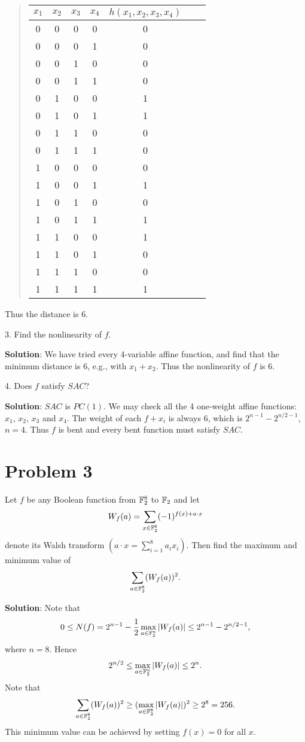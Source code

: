 \documentclass[12pt]{article}
\theoremstyle{plain}
\begin{document}
\begin{quote}
\begin{tabular}{c c c c| c || c || c }
$x_1$ & $x_2$ & $x_3$ & $x_4$ & $h(x_1, x_2, x_3, x_4)$ \\
\hline
0 & 0 & 0 & 0 & 0 \\
0 & 0 & 0 & 1 & 0 \\
0 & 0 & 1 & 0 & 0 \\
0 & 0 & 1 & 1 & 0 \\
0 & 1 & 0 & 0 & 1 \\
0 & 1 & 0 & 1 & 1 \\
0 & 1 & 1 & 0 & 0 \\
0 & 1 & 1 & 1 & 0 \\
1 & 0 & 0 & 0 & 0 \\
1 & 0 & 0 & 1 & 1 \\
1 & 0 & 1 & 0 & 0 \\
1 & 0 & 1 & 1 & 1 \\
1 & 1 & 0 & 0 & 1 \\
1 & 1 & 0 & 1 & 0 \\
1 & 1 & 1 & 0 & 0 \\
1 & 1 & 1 & 1 & 1 \\
\end{tabular}
\end{quote}
Thus the distance is 6.

3. Find the nonlinearity of $f$.

{\bf Solution}: We have tried every 4-variable affine function, and find that the minimum distance is 6, e.g., with $x_1 + x_2$. Thus the nonlinearity of $f$ is 6.

4. Does $f$ satisfy $SAC$?

{\bf Solution}: $SAC$ is $PC(1)$. We may check all the 4 one-weight affine functions: $x_1$, $x_2$, $x_3$ and $x_4$. The weight of each $f+x_i$ is always 6, which is $2^{n-1} - 2^{n/2-1}$, $n=4$. Thus $f$ is bent and every bent function must satisfy $SAC$.


\section{Problem 3}
Let $f$ be any Boolean function from $\mathbb{F}_2^8$ to $\mathbb{F}_2$ and let 
$$W_f(a) = \sum_{x\in \mathbb{F}_2^8} (-1)^{f(x)+a\cdot x}$$
denote its Walsh transform $(a\cdot x = \sum_{i=1}^8 a_i x_i)$. Then find the maximum and minimum value of
$$\sum_{a \in \mathbb{F}_2^8}(W_f(a))^2.$$

{\bf Solution}: Note that
$$0 \leq N(f) = 2^{n-1} -\frac{1}{2}\max_{a\in\mathbb{F}_2^n}|W_f(a)| \leq 2^{n-1} - 2^{n/2-1},$$
where $n=8$.
Hence
$$2^{n/2} \leq \max_{a\in\mathbb{F}_2^n}|W_f(a)| \leq 2^{n}.$$
Note that
$$\sum_{a \in \mathbb{F}_2^8}(W_f(a))^2 \geq (\max_{a\in\mathbb{F}_2^8}|W_f(a)|)^2 \geq 2^8 = 256.$$
This minimum value can be achieved by setting $f(x)=0$ for all $x$.
\end{document}
